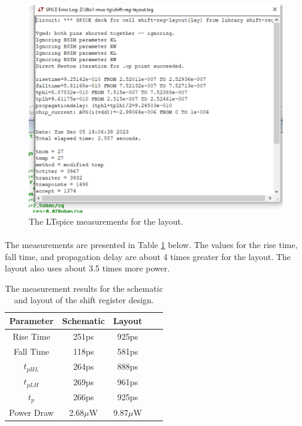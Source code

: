 \documentclass{article}
\begin{document}
  \begin{figure}[H]
    \centering
    \includegraphics[width=0.7\linewidth, frame]{screenshots/lay-meas.png}
    \caption{The LTspice measurements for the layout.}
    \label{fig:lay-meas}
  \end{figure}

  \paragraph{}
  The measurements are presented in Table \ref{table:meas} below. The values for the rise time, fall time, and propagation delay are about 4 times greater for the layout. The layout also uses about 3.5 times more power.

    \begin{table}[H]
      \centering
      \footnotesize
      \begin{tabular}{|c|c|c|c|c|}
        \hline
        \textbf{Parameter} & \textbf{Schematic} & \textbf{Layout}\\
        \hline
        Rise Time & 251ps& 925ps\\
        \hline
        Fall Time & 118ps & 581ps\\
        \hline
        $t_{pHL}$ & 264ps & 888ps\\
        \hline
        $t_{pLH}$ & 269ps & 961ps\\
        \hline
        $t_{p}$ & 266ps & 925ps\\
        \hline
        Power Draw & 2.68$\mu$W & 9.87$\mu$W  \\
       \hline
      \end{tabular}
      \caption{The measurement results for the schematic and layout of the shift register design.}
      \label{table:meas}
    \end{table}
\end{document}
